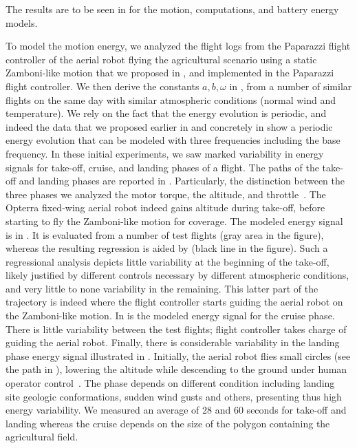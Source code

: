 The results are to be seen in  for the motion, computations, and battery energy models.

To model the motion energy, we analyzed the flight logs from the Paparazzi flight controller of the aerial robot flying the agricultural scenario using a static Zamboni-like motion that we proposed in , and implemented in the Paparazzi flight controller. We then derive the constants $a,b,\omega$ in , from a number of similar flights on the same day with similar atmospheric conditions (normal wind and temperature). We rely on the fact that the energy evolution is periodic, and indeed the data that we proposed earlier in  and concretely in  show a periodic energy evolution that can be modeled with three frequencies including the base frequency. In these initial experiments, we saw marked variability in energy signals for take-off, cruise, and landing phases of a flight. The paths of the take-off and landing phases are reported in . Particularly, the distinction between the three phases we analyzed the motor torque, the altitude, and throttle~\citep{seewald2020mechanical}. The Opterra fixed-wing aerial robot indeed gains altitude during take-off, before starting to fly the Zamboni-like motion for coverage. The modeled energy signal is in . It is evaluated from a number of test flights (gray area in the figure), whereas the resulting regression is aided by \matlab (black line in the figure). Such a regressional analysis depicts little variability at the beginning of the take-off, likely justified by different controls necessary by different atmospheric conditions, and very little to none variability in the remaining. This latter part of the trajectory is indeed where the flight controller starts guiding the aerial robot on the Zamboni-like motion. In  is the modeled energy signal for the cruise phase. There is little variability between the test flights; flight controller takes charge of guiding the aerial robot. Finally, there is considerable variability in the landing phase energy signal illustrated in . Initially, the aerial robot flies small circles (see the path in ), lowering the altitude while descending to the ground under human operator control~\citep{seewald2020mechanical}. The phase depends on different condition including landing site geologic conformations, sudden wind gusts and others, presenting thus high energy variability. We measured an average of 28 and 60 seconds for take-off and landing whereas the cruise depends on the size of the polygon containing the agricultural field.

